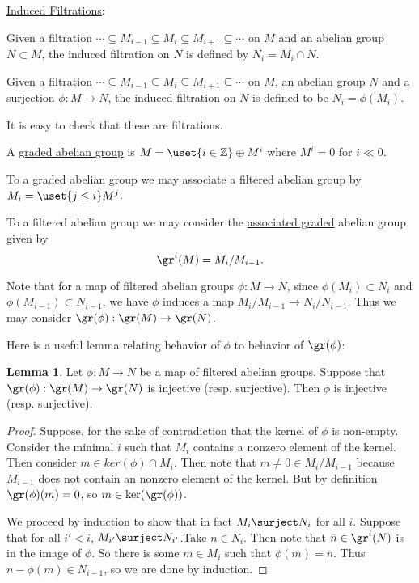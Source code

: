 \documentclass[12 pt]{article}
\theoremstyle{definition}
\newtheorem{lemma}[theorem]{Lemma}
\newcommand\zz{\mathbb{Z}}
\begin{document}
\begin{definition} \underline{Induced Filtrations}:

Given a filtration $\cdots \subseteq M_{i-1} \subseteq M_i \subseteq M_{i+1} \subseteq \cdots$ on $M$ and an abelian group $N \subset M$, the induced filtration on $N$ is defined by $N_i=M_i \cap N$.

Given a filtration $\cdots \subseteq M_{i-1} \subseteq M_i \subseteq M_{i+1} \subseteq \cdots$ on $M$, an abelian group $N$ and a surjection $\phi:M \to N$, the induced filtration on $N$ is defined to be $N_i=\phi(M_i)$.

It is easy to check that these are filtrations.
\end{definition}



\begin{definition} A \underline{graded abelian group} is $M=\uset{i \in \zz}\oplus M^i$ where $M^i=0$ for $i\ll0$.

To a graded abelian group we may associate a filtered abelian group by $M_i=\uset{j \leq i}M^j$.

To a filtered abelian group we may consider the \underline{associated graded} abelian group given by
\[\gr^i(M)=M_i/M_{i-1}.\]
\end{definition}

Note that for a map of filtered abelian groups $\phi:M \to N$, since $\phi(M_i)\subset N_i$ and $\phi(M_{i-1})\subset N_{i-1}$, we have $\phi$ induces a map $M_i/M_{i-1} \to N_i/N_{i-1}$. Thus we may consider $\gr(\phi):\gr(M) \to \gr(N)$.

Here is a useful lemma relating behavior of $\phi$ to behavior of $\gr(\phi)$:

\begin{lemma} Let $\phi:M \to N$ be a map of filtered abelian groups. Suppose that $\gr(\phi):\gr(M) \to \gr(N)$ is injective (resp. surjective). Then $\phi$ is injective (resp. surjective).
\end{lemma}

\begin{proof}

Suppose, for the sake of contradiction that the kernel of $\phi$ is non-empty. Consider the minimal $i$ such that $M_i$ contains a nonzero element of the kernel. Then consider $m \in ker(\phi) \cap M_i$. Then note that $m \neq 0 \in M_i/M_{i-1}$ because $M_{i-1}$ does not contain an nonzero element of the kernel. But by definition $\gr(\phi)(m)=0$, so $m \in \ker(\gr(\phi))$.


We proceed by induction to show that in fact $M_i \surject N_i$ for all $i$. Suppose that for all $i'<i$, $M_{i'} \surject N_{i'}$.Take $n \in N_i$. Then note that $\bar{n} \in \gr^{i}(N)$ is in the image of $\phi$. So there is some $m \in M_i$ such that $\phi(\bar{m})=\bar{n}$. Thus $n-\phi(m) \in N_{i-1}$, so we are done by induction.

\end{proof}
\end{document}
